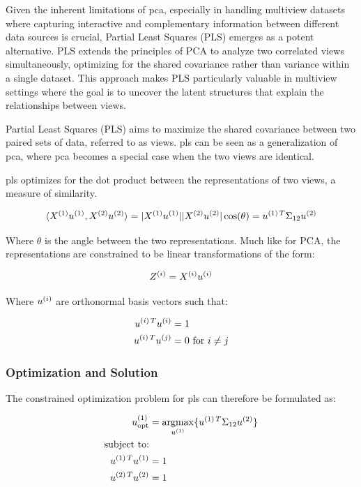 Given the inherent limitations of \acrshort{pca}, especially in handling multiview datasets where capturing interactive and complementary information between different data sources is crucial, Partial Least Squares (PLS) emerges as a potent alternative. PLS extends the principles of PCA to analyze two correlated \gls{views} simultaneously, optimizing for the shared covariance rather than variance within a single dataset. This approach makes PLS particularly valuable in multiview settings where the goal is to uncover the latent structures that explain the relationships between views.

Partial Least Squares (PLS) \citep{wold1975path} aims to maximize the shared covariance between two paired sets of data, referred to as \gls{views}. \acrshort{pls} can be seen as a generalization of \acrshort{pca}, where \acrshort{pca} becomes a special case when the two \gls{views} are identical.

\acrshort{pls} optimizes for the dot product between the \gls{representations} of two views, a measure of similarity.

\begin{align}
    \label{eq:dot-product}
    \langle X^{(1)}u^{(1)}, X^{(2)}u^{(2)}\rangle = |X^{(1)}u^{(1)}| |X^{(2)}u^{(2)}| \cos(\theta) = u^{(1)\,T} \Sigma_{12} u^{(2)}
\end{align}

Where $\theta$ is the angle between the two representations.
Much like for PCA, the \gls{representations} are constrained to be linear transformations of the form:

\begin{align}
    Z^{(i)} = X^{(i)} u^{(i)}
\end{align}

Where $u^{(i)}$ are orthonormal basis vectors such that:

\begin{align}
    u^{(i)\,T}u^{(i)} & = 1 \\
    u^{(i)\,T}u^{(j)} & = 0 \text{ for } i \neq j
\end{align}

\subsubsection{Optimization and Solution}

The constrained optimization problem for \acrshort{pls} can therefore be formulated as:

\begin{align}
    u^{(1)}_{\text{opt}} & = \underset{u^{(1)}}{\mathrm{argmax}} \{ u^{(1)\,T} \Sigma_{12} u^{(2)} \} \\
    \text{subject to:} \notag                                                                             \\
    u^{(1)\,T}u^{(1)}   & = 1 \notag                                                                    \\
    u^{(2)\,T}u^{(2)}   & = 1 \notag
\end{align}

